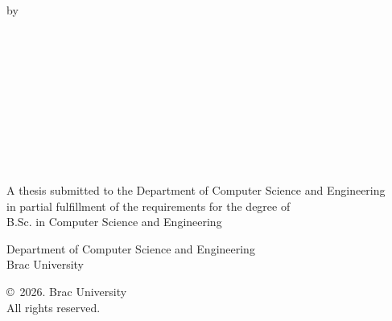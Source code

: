 \begin{titlepage}
\renewcommand*{\thepage}{Title} %

    \begin{center}
        \vspace*{2cm} %

        {\fontsize{16pt}{22pt}\selectfont \ThesisTitle\par} %

        \vspace{1.2cm}

        by

        \vspace{0.5cm}

        \StudentOneName\\
        \StudentOneID\\[0.25em]
        \StudentTwoName\\
        \StudentTwoID\\[0.25em]
        \StudentThreeName\\
        \StudentThreeID\\[0.25em]
        \StudentFourName\\
        \StudentFourID\\[0.25em]
        \StudentFiveName\\
        \StudentFiveID

        \vspace{1.2cm}

        A thesis submitted to the Department of Computer Science and Engineering\\
        in partial fulfillment of the requirements for the degree of\\
        B.Sc. in Computer Science and Engineering

        \vspace{2cm}

        Department of Computer Science and Engineering\\
        Brac University\\
        \SubmissionMonthYear

        \vspace{2.2cm}

        \copyright\ 2026. Brac University\\
        All rights reserved.

    \end{center}

\end{titlepage}
